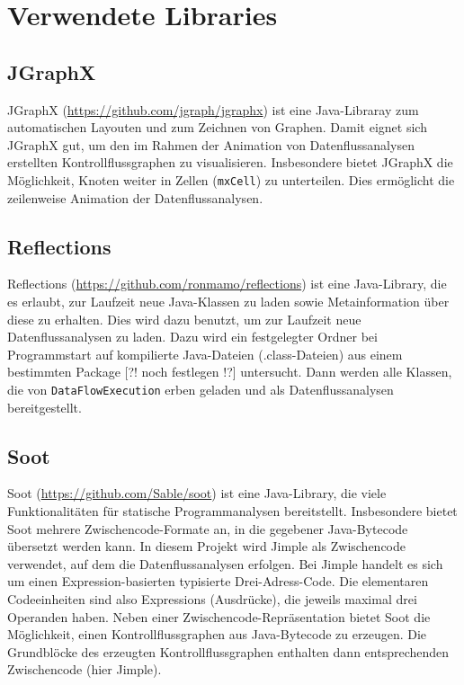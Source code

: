 
\section{Verwendete Libraries}

\subsection{JGraphX}

JGraphX (\url{https://github.com/jgraph/jgraphx}) ist eine Java-Libraray zum automatischen Layouten und zum Zeichnen von Graphen. 
Damit eignet sich JGraphX gut, um den im Rahmen der Animation von Datenflussanalysen erstellten Kontrollflussgraphen zu visualisieren.
Insbesondere bietet JGraphX die Möglichkeit, Knoten weiter in Zellen (\lstinline{mxCell}) zu unterteilen.
Dies ermöglicht die zeilenweise Animation der Datenflussanalysen.

\subsection{Reflections}

Reflections (\url{https://github.com/ronmamo/reflections}) ist eine Java-Library, die es erlaubt, zur Laufzeit neue Java-Klassen zu laden sowie Metainformation über diese zu erhalten.
Dies wird dazu benutzt, um zur Laufzeit neue Datenflussanalysen zu laden.
Dazu wird ein festgelegter Ordner bei Programmstart auf kompilierte Java-Dateien (.class-Dateien) aus einem bestimmten Package [?! noch festlegen !?] untersucht. 
Dann werden alle Klassen, die von \lstinline{DataFlowExecution} erben geladen und als Datenflussanalysen bereitgestellt. 


\subsection{Soot}

Soot (\url{https://github.com/Sable/soot}) ist eine Java-Library, die viele Funktionalitäten für statische Programmanalysen bereitstellt. 
Insbesondere bietet Soot mehrere Zwischencode-Formate an, in die gegebener Java-Bytecode übersetzt werden kann. 
In diesem Projekt wird Jimple als Zwischencode verwendet, auf dem die Datenflussanalysen erfolgen.
Bei Jimple handelt es sich um einen Expression-basierten typisierte Drei-Adress-Code.
Die elementaren Codeeinheiten sind also Expressions (Ausdrücke), die jeweils maximal drei Operanden haben.
Neben einer Zwischencode-Repräsentation bietet Soot die Möglichkeit, einen Kontrollflussgraphen aus Java-Bytecode zu erzeugen.
Die Grundblöcke des erzeugten Kontrollflussgraphen enthalten dann entsprechenden Zwischencode (hier Jimple).
